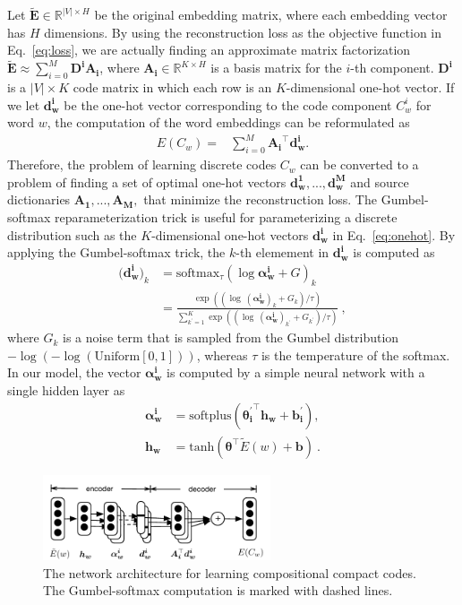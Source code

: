 \documentclass{article} %
\begin{document}
Let $\mathbf{\tilde E} \in \mathbb{R}^{|V| \times H}$ be the original embedding matrix, where each embedding vector has $H$ dimensions.
By using the reconstruction loss as the objective function in Eq.~\ref{eq:loss}, we are actually finding an approximate matrix factorization $\mathbf{\tilde E} \approx \sum_{i=0}^{M} \bm{D^i} \bm{A_i}$, where $\bm{A_i} \in \mathbb{R}^{K \times H}$ is a basis matrix for the $i$-th component. $\bm{D^i}$ is a $|V| \times K$ code matrix in which each row is an $K$-dimensional one-hot vector. If we let $\bm{d^i_w}$ be the one-hot vector corresponding to the code component $C^i_w$ for word $w$, the computation of the word embeddings can be reformulated as
\begin{align}
    E(C_w) =& \sum_{i=0}^{M} \bm{A_i}^\top \bm{d^i_w}. \label{eq:onehot}
\end{align}
Therefore, the problem of learning discrete codes $C_w$ can be converted to a problem of finding a set of optimal one-hot vectors $\bm{d^1_w}, ..., \bm{d^M_w}$ and source dictionaries $\bm{A_1}, ..., \bm{A_M},$ that minimize the reconstruction loss. The Gumbel-softmax reparameterization trick \citep{Maddison2016TheCD,Jang2016CategoricalRW} is useful for parameterizing a discrete distribution such as the $K$-dimensional one-hot vectors $\bm{d^i_w}$ in Eq.~\ref{eq:onehot}. By applying the Gumbel-softmax trick, the $k$-th elemement in $\bm{d^i_w}$ is computed as
\begin{align}
    \bigl(\bm{d^i_w}\bigr)_k &= \mathrm{softmax}_\tau (\log \bm{\alpha^i_w} + G)_k \\
    &= \frac{
        \exp ((\log \ (\bm{\alpha^i_w})_{k} + G_k)/\tau)
    }{
        \sum_{k^\prime=1}^{K} \exp ((\log \ (\bm{\alpha^i_w})_{k^\prime} + G_{k^\prime})/\tau)
    }\:, \label{eq:gumbel}
\end{align}
where $G_k$ is a noise term that is sampled from the Gumbel distribution $- \log (- \log (\mathrm{Uniform}[0,1]))$, whereas $\tau$ is the temperature of the softmax. In our model, the vector $\bm{\alpha^i_w}$ is computed by a simple neural network with a single hidden layer as
\begin{align}
    \bm{\alpha^i_w} &= \mathrm{softplus}(\bm{{\theta^{\prime}_i}}^\top \bm{h_w} + \bm{b^{\prime}_i}), \\
    \bm{h_w} &= \mathrm{tanh}(\bm{\theta}^\top \tilde E(w) + \bm{b})  \:.
\end{align}
\begin{figure}[t]
  \centering
  \includegraphics[width=0.6\textwidth]{figures/arch}
  \caption{The network architecture for learning compositional compact codes. The Gumbel-softmax computation is marked with dashed lines.}
  \label{fig:arch}
\end{figure}
\end{document}
